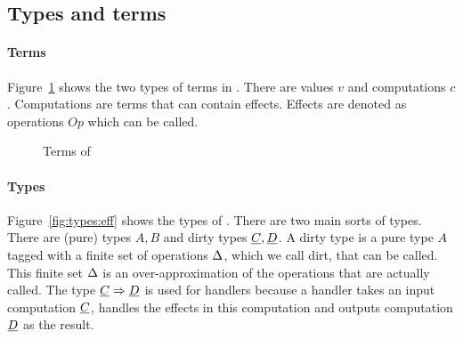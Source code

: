 \subsection{Types and terms}

\paragraph{Terms}
Figure~\ref{fig:terms:eff} shows the two types of terms in \eff. There are values $v$ and computations $c$. Computations are terms that can contain effects. Effects are denoted as operations $Op$ which can be called.

\begin{figure}[!htb]
\begin{center}
\end{center}
\caption{Terms of \eff}\label{fig:terms:eff}
\end{figure}

\paragraph{Types}
Figure~\ref{fig:types:eff} shows the types of \eff. There are two main sorts of types. There are (pure) types $A, B$ and dirty types $\underline{C}, \underline{D}$. A dirty type is a pure type $A$ tagged with a finite set of operations $\Delta$, which we call dirt, that can be called. This finite set $\Delta$ is an over-approximation of the operations that are actually called. The type $\underline{C} \Rightarrow \underline{D}$ is used for handlers because a handler takes an input computation $\underline{C}$, handles the effects in this computation and outputs computation $\underline{D}$ as the result.


